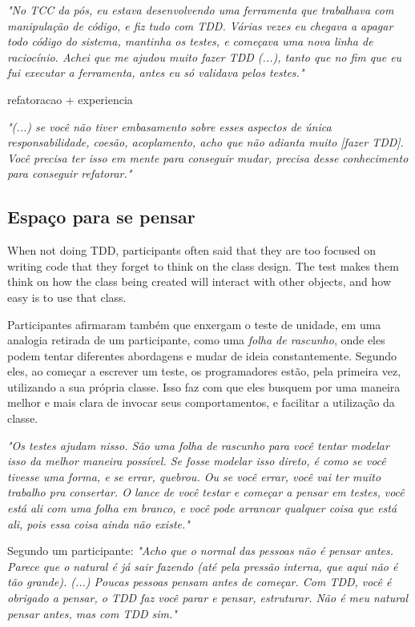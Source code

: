 \textit{"No TCC da pós, eu estava desenvolvendo uma ferramenta que trabalhava com manipulação de código, e fiz
tudo com TDD. Várias vezes eu chegava a apagar todo código do sistema, mantinha os testes, e começava uma nova
linha de raciocínio. Achei que me ajudou muito fazer TDD (...), tanto que no fim que eu fui executar a ferramenta,
antes eu só validava pelos testes."}

refatoracao + experiencia

\textit{"(...) se você não tiver embasamento sobre esses aspectos de única responsabilidade,
coesão, acoplamento, acho que não adianta muito [fazer TDD]. Você precisa ter isso em mente
para conseguir mudar, precisa desse conhecimento para conseguir refatorar."}

\subsection{Espaço para se pensar}

When not doing TDD, participants often said that they are too focused on writing code that they forget to think on the class design. The test makes them think on how the class being created will interact with other objects, and how easy is to use that class.


Participantes afirmaram também que enxergam o teste de unidade, em uma analogia
retirada de um participante, como uma \textit{folha de rascunho},
onde eles podem tentar diferentes abordagens e mudar de ideia constantemente. Segundo eles,
ao começar a escrever um teste, os programadores estão, pela primeira vez, utilizando a sua 
própria classe. Isso faz com que eles busquem por uma maneira melhor e mais clara de invocar
seus comportamentos, e facilitar a utilização da classe.

\textit{"Os testes ajudam nisso. São uma folha de rascunho para você tentar modelar
isso da melhor maneira possível. Se fosse modelar isso direto, é como se você tivesse
uma forma, e se errar, quebrou. Ou se você errar, você vai ter muito trabalho pra consertar.
O lance de você testar e começar a pensar em testes, você está ali com uma folha em branco,
e você pode arrancar qualquer coisa que está ali, pois essa coisa ainda não existe."}

Segundo um participante: \textit{"Acho que o normal das pessoas não é pensar antes. Parece que o natural
é já sair fazendo (até pela pressão interna, que aqui não é tão grande). (...) Poucas pessoas pensam
antes de começar. Com TDD, você é obrigado a pensar, o TDD faz você parar e pensar, estruturar. Não
é meu natural pensar antes, mas com TDD sim."}

